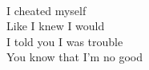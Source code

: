 \\
I cheated myself \\
Like I knew I would \\
I told you I was trouble \\
You know that I'm no good \\
